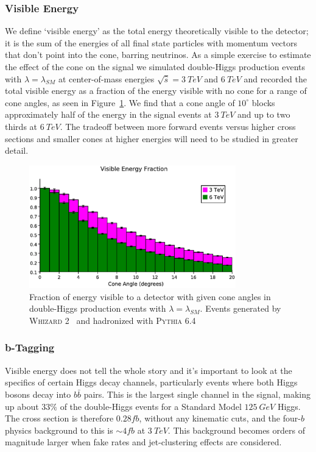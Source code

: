 \documentclass[12pt]{article}
\begin{document}
\subsubsection{Visible Energy}
We define `visible energy' as the total energy theoretically visible to the detector; it is the sum of the energies of all final state particles with momentum vectors that don't point into the cone, barring neutrinos. As a simple exercise to estimate the effect of the cone on the signal we simulated double-Higgs production events with $\lambda=\lambda_{SM}$ at center-of-mass energies $\sqrt{\hat{s}} = 3\ TeV$ and $6\ TeV$ and recorded the total visible energy as a fraction of the energy visible with no cone for a range of cone angles, as seen in Figure~\ref{fig:visen}. We find that a cone angle of $10^{\circ}$ blocks approximately half of the energy in the signal events at $3\ TeV$ and up to two thirds at $6\ TeV$. The tradeoff between more forward events versus higher cross sections and smaller cones at higher energies will need to be studied in greater detail.

\begin{figure}
	\centering
	\includegraphics[width=0.8\textwidth]{visen}
	\caption{Fraction of energy visible to a detector with given cone angles in double-Higgs production events with $\lambda=\lambda_{SM}$. Events generated by \textsc{Whizard 2}~\cite{whizard} and hadronized with \textsc{Pythia 6.4}~\cite{pythia}}\label{fig:visen}
\end{figure}

\subsubsection{b-Tagging}
Visible energy does not tell the whole story and it's important to look at the specifics of certain Higgs decay channels, particularly events where both Higgs bosons decay into $b\bar{b}$ pairs. This is the largest single channel in the signal, making up about $33\%$ of the double-Higgs events for a Standard Model $125\ GeV$ Higgs. The cross section is therefore $0.28fb$, without any kinematic cuts, and the four-$b$ physics background to this is $\sim4fb$ at $3\ TeV$. This background becomes orders of magnitude larger when fake rates and jet-clustering effects are considered.
\end{document}
